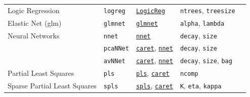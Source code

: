 \documentclass[12pt]{article}
\newcommand{\code}[1]{\mbox{\footnotesize\color{darkblue}\texttt{#1}}}
\begin{document}
\begin{landscape}
\begin{longtable}{lllll}
\rowcolor[rgb]{.95, .95, .95}               
      Logic Regression &
         \code{logreg} & 
            {\tt \href{http://cran.r-project.org/web/packages/LogicReg/index.html}{LogicReg}}  & 
            \code{ntrees}, \code{treesize} & \\ 
            
     Elastic Net (glm) &               
         \code{glmnet} & 
             {\tt \href{http://cran.r-project.org/web/packages/glmnet/index.html}{glmnet}}       &       
            \code{alpha}, \code{lambda} & \\ 
            
\rowcolor[rgb]{.95, .95, .95}                   
      Neural Networks &               
         \code{nnet} & 
             {\tt \href{http://cran.r-project.org/web/packages/nnet/index.html}{nnet}}       &       
            \code{decay}, \code{size} & \\      

\rowcolor[rgb]{.95, .95, .95}         
       &               
         \code{pcaNNet} & 
            {\tt \href{http://cran.r-project.org/web/packages/caret/index.html}{caret}},
            {\tt \href{http://cran.r-project.org/web/packages/nnet/index.html}{nnet}}&       
            \code{decay}, \code{size} & \\              
   
\rowcolor[rgb]{.95, .95, .95}         
       &               
         \code{avNNet} & 
            {\tt \href{http://cran.r-project.org/web/packages/caret/index.html}{caret}},
            {\tt \href{http://cran.r-project.org/web/packages/nnet/index.html}{nnet}}&       
            \code{decay}, \code{size}, \code{bag} & \\                  
            
     Partial Least Squares &
         \code{pls} & 
             {\tt \href{http://cran.r-project.org/web/packages/pls/index.html}{pls}},  {\tt \href{http://cran.r-project.org/web/packages/caret/index.html}{caret}}       & 
            \code{ncomp} & \\      

\rowcolor[rgb]{.95, .95, .95}   
      Sparse Partial Least Squares&
         \code{spls} & 
             {\tt \href{http://cran.r-project.org/web/packages/spls/index.html}{spls}}, 
             {\tt \href{http://cran.r-project.org/web/packages/caret/index.html}{caret}}      & 
            \code{K}, \code{eta}, \code{kappa} & \\   


\end{longtable}
\end{landscape}
\end{document}
